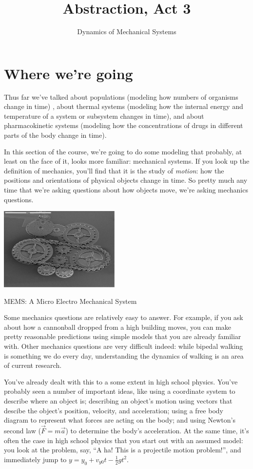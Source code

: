\documentclass{tufte-handout}
\title{Abstraction, Act 3}
\author{Dynamics of Mechanical Systems}
\begin{document}
\maketitle


\section{Where we're going}

Thus far we've talked about populations (modeling how numbers of organisms change in time) , about thermal systems (modeling how the internal energy and temperature of a system or subsystem changes in time), and about pharmacokinetic systems (modeling how the concentrations of drugs in different parts of the body change in time).

In this section of the course, we're going to do some modeling that probably, at least on the face of it, looks more familiar:  mechanical systems.  If you look up the definition of mechanics, you'll find that it is the study of {\it motion}: how the positions and orientations of physical objects change in time.  So pretty much any time that we're asking questions about how objects move, we're asking mechanics questions.  

\begin{marginfigure}
\includegraphics[width=6cm]{figs/MEMS}
\caption{MEMS: A Micro Electro Mechanical System}
\end{marginfigure}

Some mechanics questions are relatively easy to answer.  For example, if you ask about how a cannonball dropped from a high building moves, you can make pretty reasonable predictions using simple models that you are already familiar with.  Other mechanics questions are very difficult indeed:  while bipedal walking is something we do every day, understanding the dynamics of walking is an area of current research. 

You've already dealt with this to a some extent in high school physics.  You've probably seen a number of important ideas, like using a coordinate system to describe where an object is;
describing an object's motion using vectors that descibe the object's position, velocity, and acceleration;
using a free body diagram to represent what forces are acting on the body;
 and using Newton's second law ($\vec{F} = m\vec{a}$) to determine the body's acceleration.  At the same time, it's often the case in high school physics that you start out with an assumed model:  you look at the problem, say, ``A ha!  This is a projectile motion problem!'', and immediately jump to $y = y_0 + v_{y0} t - \frac{1}{2} g t^2$.
\end{document}
